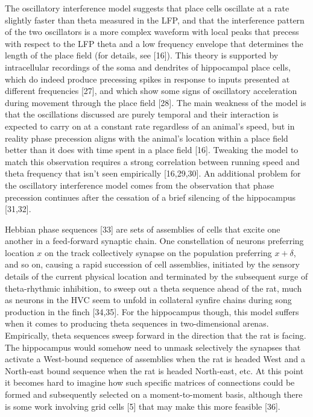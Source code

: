 \documentclass[]{article}
\begin{document}
The oscillatory interference model suggests that place cells oscillate
at a rate slightly faster than theta measured in the LFP, and that the
interference pattern of the two oscillators is a more complex waveform
with local peaks that precess with respect to the LFP theta and a low
frequency envelope that determines the length of the place field (for
details, see {[}16{]}). This theory is supported by intracellular
recordings of the soma and dendrites of hippocampal place cells, which
do indeed produce precessing spikes in response to inputs presented at
different frequencies {[}27{]}, and which show some signs of oscillatory
acceleration during movement through the place field {[}28{]}. The main
weakness of the model is that the oscillations discussed are purely
temporal and their interaction is expected to carry on at a constant
rate regardless of an animal's speed, but in reality phase precession
aligns with the animal's location within a place field better than it
does with time spent in a place field {[}16{]}. Tweaking the model to
match this observation requires a strong correlation between running
speed and theta frequency that isn't seen empirically {[}16,29,30{]}. An
additional problem for the oscillatory interference model comes from the
observation that phase precession continues after the cessation of a
brief silencing of the hippocampus {[}31,32{]}.

Hebbian phase sequences {[}33{]} are sets of assemblies of cells that
excite one another in a feed-forward synaptic chain. One constellation
of neurons preferring location \(x\) on the track collectively synapse
on the population preferring \(x+\delta\), and so on, causing a rapid
succession of cell assemblies, initiated by the sensory details of the
current physical location and terminated by the subsequent surge of
theta-rhythmic inhibition, to sweep out a theta sequence ahead of the
rat, much as neurons in the HVC seem to unfold in collateral synfire
chains during song production in the finch {[}34,35{]}. For the
hippocampus though, this model suffers when it comes to producing theta
sequences in two-dimensional arenas. Empirically, theta sequences sweep
forward in the direction that the rat is facing. The hippocampus would
somehow need to unmask selectively the synapses that activate a
West-bound sequence of assemblies when the rat is headed West and a
North-east bound sequence when the rat is headed North-east, etc. At
this point it becomes hard to imagine how such specific matrices of
connections could be formed and subsequently selected on a
moment-to-moment basis, although there is some work involving grid cells
{[}5{]} that may make this more feasible {[}36{]}.
\end{document}
